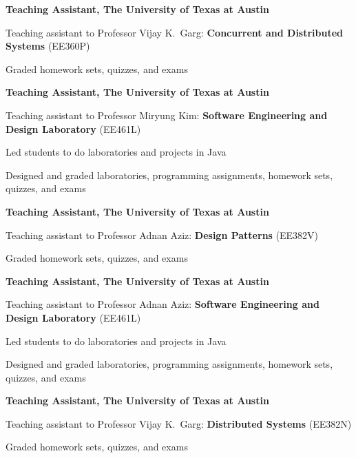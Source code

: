\begin{myexp}
\item \textbf{Teaching Assistant, The University of Texas at 
    Austin}  
    \begin{mybullet}
        \item Teaching assistant to Professor Vijay K.~Garg: {\bf Concurrent
            and Distributed Systems} (EE360P) 
        \item Graded homework sets, quizzes, and exams
    \end{mybullet}
\item \textbf{Teaching Assistant, The University of Texas at
    Austin}  
    \begin{mybullet}
        \item Teaching assistant to Professor Miryung Kim: {\bf Software 
            Engineering and Design Laboratory} (EE461L) 
        \item Led students to do laboratories and projects in Java
        \item Designed and graded laboratories, programming assignments, 
            homework sets, quizzes, and exams
    \end{mybullet}
\item \textbf{Teaching Assistant, The University of Texas at 
    Austin}   
    \begin{mybullet}
        \item Teaching assistant to Professor Adnan Aziz: {\bf Design Patterns
            } (EE382V) 
        \item Graded homework sets, quizzes, and exams
    \end{mybullet}
\item \textbf{Teaching Assistant, The University of Texas at 
    Austin}   
    \begin{mybullet}
        \item Teaching assistant to Professor Adnan Aziz: {\bf Software 
            Engineering and Design Laboratory} (EE461L) 
        \item Led students to do laboratories and projects in Java
        \item Designed and graded laboratories, programming assignments, 
            homework sets, quizzes, and exams
    \end{mybullet}

\item \textbf{Teaching Assistant, The University of Texas at 
    Austin}  
    \begin{mybullet}
        \item Teaching assistant to Professor Vijay K.~Garg: {\bf Distributed 
            Systems} (EE382N) 
        \item Graded homework sets, quizzes, and exams
    \end{mybullet}
\end{myexp}
